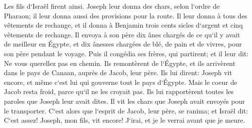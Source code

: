 \verse Les fils d`Israël firent ainsi. Joseph leur donna des chars, selon l`ordre de Pharaon; il leur donna aussi des provisions pour la route. 
\verse Il leur donna à tous des vêtements de rechange, et il donna à Benjamin trois cents sicles d`argent et cinq vêtements de rechange. 
\verse Il envoya à son père dix ânes chargés de ce qu`il y avait de meilleur en Égypte, et dix ânesses chargées de blé, de pain et de vivres, pour son père pendant le voyage. 
\verse Puis il congédia ses frères, qui partirent; et il leur dit: Ne vous querellez pas en chemin. 
\verse Ils remontèrent de l`Égypte, et ils arrivèrent dans le pays de Canaan, auprès de Jacob, leur père. 
\verse Ils lui dirent: Joseph vit encore, et même c`est lui qui gouverne tout le pays d`Égypte. Mais le coeur de Jacob resta froid, parce qu`il ne les croyait pas. 
\verse Ils lui rapportèrent toutes les paroles que Joseph leur avait dites. Il vit les chars que Joseph avait envoyés pour le transporter. C`est alors que l`esprit de Jacob, leur père, se ranima; 
\verse et Israël dit: C`est assez! Joseph, mon fils, vit encore! J`irai, et je le verrai avant que je meure. 

\chapter{}


